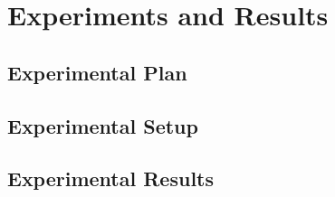\chapter{Experiments and Results}
\label{cha:experiments}

\section{Experimental Plan}
\label{sec:experimentalPlan}

\begin{comment}
Trying and failing is a major part of research. However, to have a chance of success you need a plan driving the experimental research, just as you need a plan for your literature search. Further, plans are made to be revised and this revision ensures that any further decisions made are in line with the work already completed.

The plan should include what experiments or series of experiments are planned and what questions the individual or set of experiments aim to answer. Such questions should be connected to your research questions, so that in the evaluation of your results you can discuss the results wrt to the research questions.
\end{comment}
\section{Experimental Setup}
\label{sec:experimentalSetup}

\begin{comment}
The experimental setup should include all data --- parameters, etc. --- that would allow a person to repeat your experiments.
This will thus be the actual instantiation for each experiment of the general architecture described in Chapter~\ref{cha:architecture}.
\end{comment}
\section{Experimental Results}
\label{sec:experimentalResults}

\begin{comment}
Results should be clearly displayed and should provide a suitable representation of your results for the points you wish to make.
Graphs should be labelled in a legible font. If more than one result is displayed in the same graph, then these should be clearly marked.
Please choose carefully rather than presenting every result. Too much information is hard to read and often hides the key information you wish to present. Make use of statistical methods when presenting results, where possible to strengthen the results.
Further, the format of the presentation of results should be chosen based on what issues in the results you wish to highlight.
You may wish to present a subset in the experimental section and provide additional results in an appendix.
Point out specifics here but save the overall/general discussion to the Discussion chapter.
\end{comment}
\glsresetall
